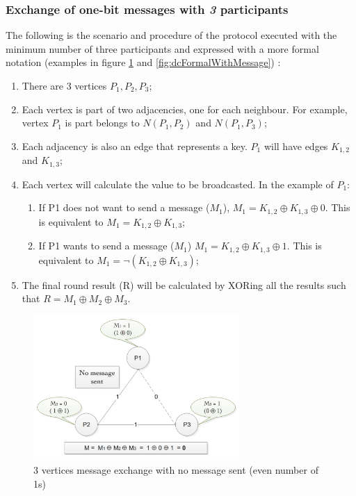 \subsubsection{Exchange of one-bit messages with \textit{3} participants}
The following is the scenario and procedure of the protocol executed with the minimum number of three participants and expressed with a more formal notation (examples in figure \ref{fig:dcFormalnoMessage} and \ref{fig:dcFormalWithMessage}) :
\begin{enumerate}
    \item There are 3 vertices \textit{$P_1, P_2, P_3$};
    \item Each vertex is part of two adjacencies, one for each neighbour. For example, vertex \textit{$P_1$} is part belongs to \textit{$N(P_1,P_2)$} and \textit{$N(P_1, P_3)$};
    \item Each adjacency is also an edge that represents a key. \textit{$P_1$} will have edges \textit{$K_{1,2}$} and \textit{$K_{1,3}$};
    \item Each vertex will calculate the value to be broadcasted. In the example of \textit{$P_1$}: 
    \begin{enumerate}
        \item If P1 does not want to send a message ($M_1$), \textit{$M_1 = K_{1,2} \oplus K_{1,3} \oplus 0 $}. This is equivalent to \textit{$M_1 = K_{1,2} \oplus K_{1,3}$};
        \item If P1 wants to send a message ($M_1$) \textit{$M_1 = K_{1,2} \oplus K_{1,3} \oplus 1 $}. This is equivalent to \textit{$M_1 = \neg(K_{1,2} \oplus K_{1,3}) $};
    \end{enumerate}
    \item The final round result (R) will be calculated by XORing all the results such that \textit{$R = M_1 \oplus M_2 \oplus M_3$}.
\end{enumerate}


\begin{figure}[h!]
    \centering
    \includegraphics[width=0.70\textwidth]{Images/DCFormalNoMessage.png}
    \caption{3 vertices message exchange with no message sent (even number of 1s)}
    \label{fig:dcFormalnoMessage}
\end{figure}

